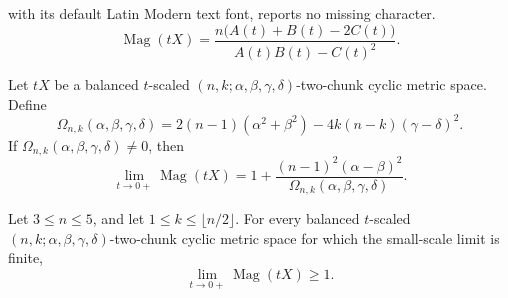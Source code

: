 \documentclass[10pt,a4paper]{amsart}
\DeclareMathOperator{\Mag}{Mag}
\begin{document}
with its default Latin Modern text font, reports no missing character.
\begin{equation}\label{eq:magnitude-formula}
\Mag(tX)=\frac{n\bigl(A(t)+B(t)-2C(t)\bigr)}{A(t)B(t)-C(t)^2}.
\end{equation}

\begin{corollary}\label{cor:one-plus-formula}
Let \(tX\) be a balanced \(t\)-scaled \((n,k;\alpha,\beta,\gamma,\delta)\)-two-chunk cyclic metric space.  Define
\begin{equation}\label{eq:Omega-definition}
\Omega_{n,k}(\alpha,\beta,\gamma,\delta)
=2(n-1)(\alpha^2+\beta^2)-4k(n-k)(\gamma-\delta)^2.
\end{equation}
If \(\Omega_{n,k}(\alpha,\beta,\gamma,\delta)\neq 0\), then
\begin{equation}\label{eq:one-plus-formula}
\lim_{t\to 0+}\Mag(tX)
=
1+\frac{(n-1)^2(\alpha-\beta)^2}
{\Omega_{n,k}(\alpha,\beta,\gamma,\delta)}.
\end{equation}
\end{corollary}

\begin{proposition}[The cases \(n=3,4,5\)]\label{prop:n-3-4-5}
Let \(3\leq n\leq 5\), and let \(1\leq k\leq \lfloor n/2\rfloor\).  For every balanced \(t\)-scaled \((n,k;\alpha,\beta,\gamma,\delta)\)-two-chunk cyclic metric space for which the small-scale limit is finite,
\begin{equation}\label{eq:n-3-4-5-geq-one}
\lim_{t\to 0+}\Mag(tX)\geq 1.
\end{equation}
\end{proposition}
\end{document}
